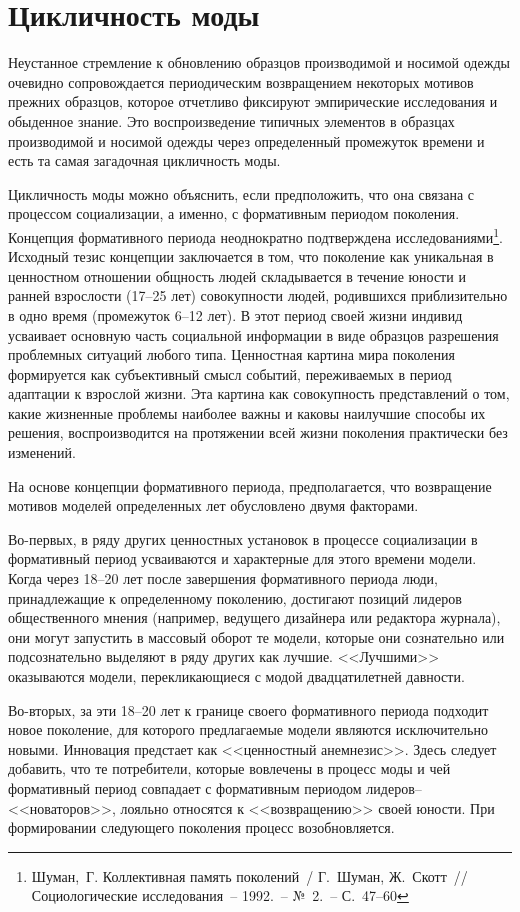   \section{Цикличность моды}
  Неустанное стремление к обновлению образцов производимой и носимой одежды
  очевидно сопровождается периодическим возвращением некоторых мотивов прежних
  образцов, которое отчетливо фиксируют эмпирические исследования и обыденное
  знание. Это воспроизведение типичных элементов в образцах производимой и
  носимой одежды через определенный промежуток времени и есть та самая
  загадочная цикличность моды.
  
  Цикличность моды можно объяснить, если предположить, что она связана с
  процессом социализации, а именно, с формативным периодом поколения. Концепция
  формативного периода неоднократно подтверждена
  исследованиями\footnote{Шуман,~Г. Коллективная память поколений~/ Г.~Шуман,
  Ж.~Скотт~// Социологические исследования~-- 1992.~-- №~2.~-- С.~47--60}.
  Исходный тезис концепции заключается в том, что поколение как уникальная в
  ценностном отношении общность людей складывается в течение юности и ранней
  взрослости (17--25 лет) совокупности людей, родившихся приблизительно в одно
  время (промежуток 6--12 лет). В этот период своей жизни индивид усваивает
  основную часть социальной информации в виде образцов разрешения проблемных
  ситуаций любого типа. Ценностная картина мира поколения формируется как
  субъективный смысл событий, переживаемых в период адаптации к взрослой жизни.
  Эта картина как совокупность представлений о том, какие жизненные проблемы
  наиболее важны и каковы наилучшие способы их решения, воспроизводится на
  протяжении всей жизни поколения практически без изменений.
  
  На основе концепции формативного периода, предполагается, что возвращение
  мотивов моделей определенных лет обусловлено двумя факторами.
  
  Во-первых, в ряду других ценностных установок в процессе социализации в
  формативный период усваиваются и характерные для этого времени модели. Когда
  через 18--20 лет после завершения формативного периода люди, принадлежащие к
  определенному поколению, достигают позиций лидеров общественного мнения
  (например, ведущего дизайнера или редактора журнала), они могут запустить в
  массовый оборот те модели, которые они сознательно или подсознательно
  выделяют в ряду других как лучшие. <<Лучшими>> оказываются модели,
  перекликающиеся с модой двадцатилетней давности.
  
  Во-вторых, за эти 18--20 лет к границе своего формативного периода подходит
  новое поколение, для которого предлагаемые модели являются исключительно
  новыми. Инновация предстает как <<ценностный анемнезис>>. Здесь следует
  добавить, что те потребители, которые вовлечены в процесс моды и чей
  формативный период совпадает с формативным периодом лидеров--<<новаторов>>,
  лояльно относятся к <<возвращению>> своей юности. При формировании следующего
  поколения процесс возобновляется.
  
